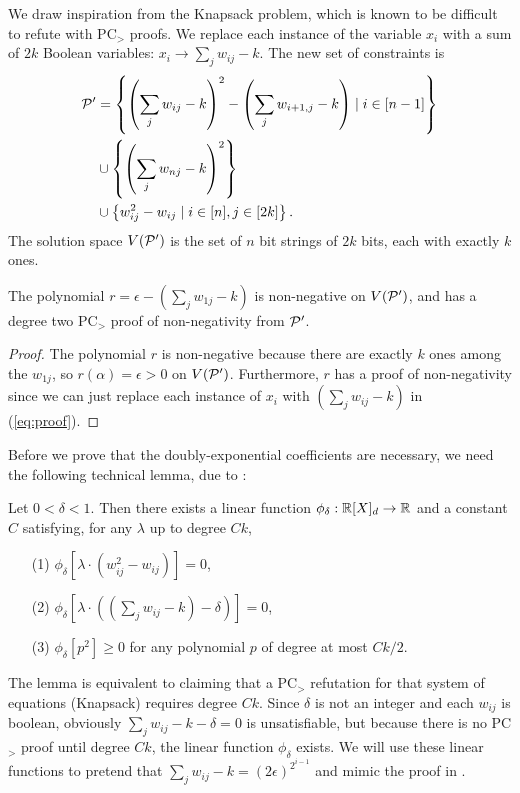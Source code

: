 We draw inspiration from the Knapsack problem, which is known to be difficult to refute with PC$_>$ proofs. We replace each instance of the variable $x_i$ with a sum of $2k$ Boolean variables: $x_i \rightarrow \sum_j w_{ij} - k$. The new set of constraints is
\begin{align*}
\mathcal P' &= \left\{\left(\sum_j w_{ij} - k\right)^2 - \left(\sum_j w_{i+1,j} - k\right) \mid i \in [n-1]\right\} \\
&\cup \left\{\left(\sum_j w_{nj} - k\right)^2 \right\} \\
&\cup \left\{w_{ij}^2 - w_{ij} \mid i \in [n], j \in [2k]\right\}.
\end{align*}
The solution space $V(\mathcal P')$ is the set of $n$ bit strings of $2k$ bits, each with exactly $k$ ones.
\begin{lemma}\label{lem:boolean-degtwoproof}
The polynomial $r = \epsilon - \left(\sum_j w_{1j} - k\right)$ is non-negative on $V(\mathcal P')$, and has a degree two PC$_>$ proof of non-negativity from $\mathcal P'$.
\end{lemma}
\begin{proof}
The polynomial $r$ is non-negative because there are exactly $k$ ones among the $w_{1j}$, so $r(\alpha) = \epsilon > 0$ on $V(\mathcal P')$.
Furthermore, $r$ has a proof of non-negativity since we can just replace each instance of $x_i$ with $\left(\sum_j w_{ij} - k\right)$ in (\ref{eq:proof}). 
\end{proof}

Before we prove that the doubly-exponential coefficients are necessary, we need the following technical lemma, due to \cite{Gri01b}:
\begin{lemma}\label{lem:knapsack-pd}
Let $0 < \delta < 1$. Then there exists a linear function $\phi_\delta: \mathbb R[X]_d \rightarrow \mathbb R$ and a constant $C$ satisfying, for any $\lambda$ up to degree $Ck$,
\begin{enumerate}
\item[(1)] $\phi_\delta[\lambda\cdot(w_{ij}^2 - w_{ij})] = 0$,
\item[(2)] $\phi_\delta[\lambda\cdot((\sum_j w_{ij} - k) - \delta)] = 0$,
\item[(3)] $\phi_\delta[p^2] \geq 0$ for any polynomial $p$ of degree at most $Ck/2$.
\end{enumerate}
\end{lemma}
The lemma is equivalent to claiming that a PC$_>$ refutation for that system of equations (Knapsack) requires degree $Ck$. Since $\delta$ is not an integer and each $w_{ij}$ is boolean, obviously $\sum_j w_{ij} - k - \delta = 0$ is unsatisfiable, but because there is no PC$_>$ proof until degree $Ck$, the linear function $\phi_\delta$ exists. We will use these linear functions to pretend that $\sum_j w_{ij} - k = (2\epsilon)^{2^{i-1}}$ and mimic the proof in .

